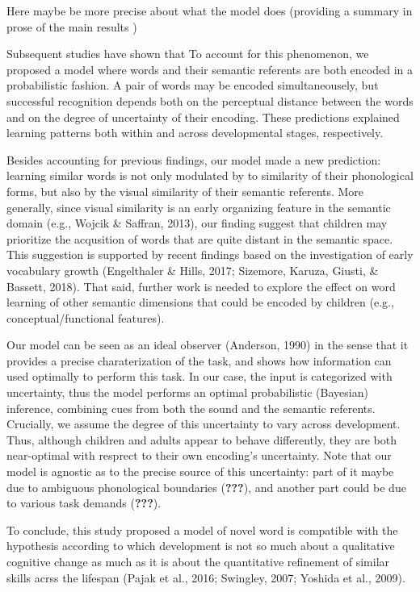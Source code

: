 \documentclass[10pt, letterpaper]{article}
\begin{document}
Here maybe be more precise about what the model does (providing a
summary in prose of the main results )

Subsequent studies have shown that To account for this phenomenon, we
proposed a model where words and their semantic referents are both
encoded in a probabilistic fashion. A pair of words may be encoded
simultaneousely, but successful recognition depends both on the
perceptual distance between the words and on the degree of uncertainty
of their encoding. These predictions explained learning patterns both
within and across developmental stages, respectively.

Besides accounting for previous findings, our model made a new
prediction: learning similar words is not only modulated by to
similarity of their phonological forms, but also by the visual
similarity of their semantic referents. More generally, since visual
similarity is an early organizing feature in the semantic domain (e.g.,
Wojcik \& Saffran, 2013), our finding suggest that children may
prioritize the acqusition of words that are quite distant in the
semantic space. This suggestion is supported by recent findings based on
the investigation of early vocabulary growth (Engelthaler \& Hills,
2017; Sizemore, Karuza, Giusti, \& Bassett, 2018). That said, further
work is needed to explore the effect on word learning of other semantic
dimensions that could be encoded by children (e.g.,
conceptual/functional features).

Our model can be seen as an ideal observer (Anderson, 1990) in the sense
that it provides a precise charaterization of the task, and shows how
information can used optimally to perform this task. In our case, the
input is categorized with uncertainty, thus the model performs an
optimal probabilistic (Bayesian) inference, combining cues from both the
sound and the semantic referents. Crucially, we assume the degree of
this uncertainty to vary across development. Thus, although children and
adults appear to behave differently, they are both near-optimal with
resprect to their own encoding's uncertainty. Note that our model is
agnostic as to the precise source of this uncertainty: part of it maybe
due to ambiguous phonological boundaries ({\textbf{???}}), and another
part could be due to various task demands ({\textbf{???}}).

To conclude, this study proposed a model of novel word is compatible
with the hypothesis according to which development is not so much about
a qualitative cognitive change as much as it is about the quantitative
refinement of similar skills acrss the lifespan (Pajak et al., 2016;
Swingley, 2007; Yoshida et al., 2009).
\end{document}
